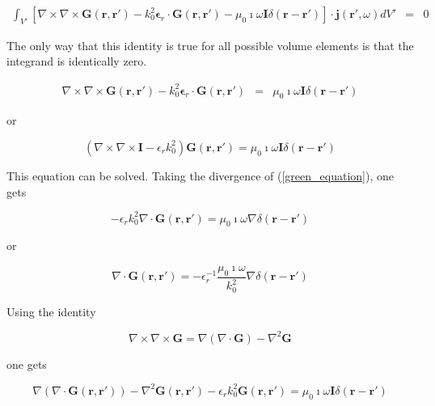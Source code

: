 \documentclass[a4paper,11pt]{thesis}
\begin{document}
\begin{eqnarray}
\int_{V'} \left[ \nabla \times \nabla \times  \mathbf{G}(\mathbf{r},\mathbf{r'}) -   k_0^2 \mathbf{\epsilon}_r \cdot  \mathbf{G}(\mathbf{r},\mathbf{r'}) - \mu_0 \imath \omega \mathbf{I}  \delta (\mathbf{r}-\mathbf{r'}) \right]\cdot \mathbf{j}(\mathbf{r'},\omega) dV' &=& 0\nonumber
\end{eqnarray}

The only way that this identity is true for all possible volume elements is that the integrand is identically zero.

\begin{eqnarray}
 \nabla \times \nabla \times  \mathbf{G}(\mathbf{r},\mathbf{r'}) -   k_0^2 \mathbf{\epsilon}_r \cdot  \mathbf{G}(\mathbf{r},\mathbf{r'})  &=& \mu_0 \imath \omega \mathbf{I}  \delta (\mathbf{r}-\mathbf{r'})
\end{eqnarray}

or

\begin{equation}
\left( \nabla \times \nabla \times  \mathbf{I} -   \epsilon_r k_0^2  \right) \mathbf{G}(\mathbf{r},\mathbf{r'}) = \mu_0 \imath \omega \mathbf{I}  \delta (\mathbf{r}-\mathbf{r'})\label{green_equation}
\end{equation}

This equation can be solved. Taking the divergence of (\ref{green_equation}), one gets

\begin{equation}
- \epsilon_r k_0^2  \nabla \cdot   \mathbf{G}(\mathbf{r},\mathbf{r'}) = \mu_0 \imath \omega \nabla \delta (\mathbf{r}-\mathbf{r'})
\end{equation}

or

\begin{equation}
  \nabla \cdot   \mathbf{G}(\mathbf{r},\mathbf{r'}) = -\epsilon_r^{-1} \frac{\mu_0 \imath \omega}{k_0^2} \nabla \delta (\mathbf{r}-\mathbf{r'})\label{divG}
\end{equation}

Using the identity

\begin{equation}
    \nabla \times \nabla \times \mathbf{G} = \nabla ( \nabla \cdot \mathbf{G})- \nabla^2 \mathbf{G}
\end{equation}

one gets


\begin{equation}
\nabla ( \nabla \cdot \mathbf{G}(\mathbf{r},\mathbf{r'}))- \nabla^2  \mathbf{G}(\mathbf{r},\mathbf{r'}) -  \epsilon_r k_0^2  \mathbf{G}(\mathbf{r},\mathbf{r'}) = \mu_0 \imath \omega \mathbf{I}  \delta (\mathbf{r}-\mathbf{r'})
\end{equation}
\end{document}
